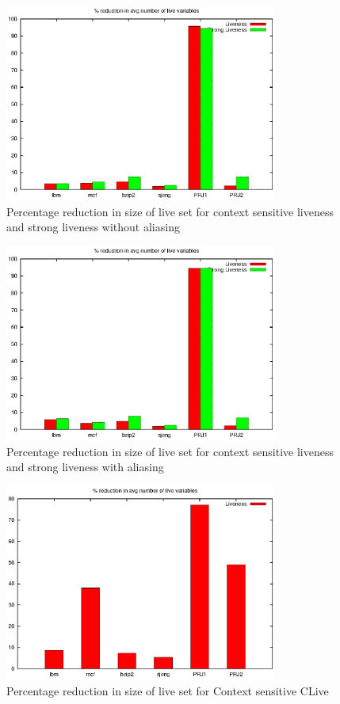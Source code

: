 \documentclass[12pt]{report}
\begin{document}
\begin{figure}[p]
\centering
\includegraphics[width=0.8\textwidth]{liveness.eps}
\caption{Percentage reduction in size of live set for context sensitive liveness and strong liveness without aliasing}
\label{fig:liveness}
\end{figure}

\begin{figure}[p]
\centering
\includegraphics[width=0.8\textwidth]{aliasliveness.eps}
\caption{Percentage reduction in size of live set for context sensitive liveness and strong liveness with aliasing}
\label{fig:livenessalias}
\end{figure}

\begin{figure}[p]
\centering
\includegraphics[width=0.8\textwidth]{clive.eps}
\caption{Percentage reduction in size of live set for Context sensitive CLive}
\label{fig:clivelive}
\end{figure}
\end{document}
